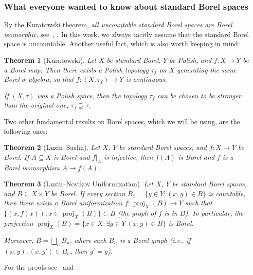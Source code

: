 \documentclass[11pt]{paper}
\newtheorem*{theorem*}{Theorem}
\begin{document}
\subsubsection*{What everyone wanted to know about standard Borel spaces}
By the Kuratowski theorem, {\em all uncountable standard Borel spaces are Borel isomorphic},
see~\cite[Section~3.3]{Srivastava}, \cite[Section~15B]{Kechris}.
In this work, we always tacitly assume that the standard Borel space is uncountable.
Another useful fact, which is also worth keeping in mind:
\begin{theorem*}[Kuratowski]
Let $X$ be standard Borel,  $Y$ be Polish, and $f\colon X\to Y$ be a Borel map.
Then there exists a Polish topology $\tau_f$ on $X$ generating the same Borel $\sigma$-algebra,
so that $f\colon (X, \tau_f) \to Y$ is continuous.

If $(X, \tau)$ was a Polish space, then the topology $\tau_f$ can be chosen to be stronger
than the original one, $\tau_f \supseteq \tau$.
\end{theorem*}
Two other fundamental results on Borel spaces, which we will be using, are the following ones:
\begin{theorem*}[Luzin--Suslin]
Let $X$, $Y$ be standard Borel spaces, and $f\colon X\to Y$ be Borel. If $A\subseteq X$ is Borel
and $f|_A$ is injective, then $f(A)$ is Borel and $f$ is a Borel isomorphism $A\to f(A)$.
\end{theorem*}
\begin{theorem*}[Luzin--Novikov Uniformization]
Let $X$, $Y$ be standard Borel spaces, and $B\subseteq X \times Y$ be Borel. If every section
$B_x = \{y\in Y\colon (x, y)\in B\}$ is countable, then there exists a Borel
uniformization $f\colon \operatorname{proj}_X(B)\to Y$
such that $\{(x, f(x))\colon x\in \operatorname{proj}_X(B)\}\subset B$ {\rm (}the graph of $f$ is in $B${\rm )}.
In particular, the projection $\operatorname{proj}_X(B) =\{x\in X\colon \exists y\in Y\ (x, y)\in B\}$
is Borel.

Moreover, $B=\bigsqcup_n B_n$, where each $B_n$ is a Borel graph
{\rm (}i.e., if $(x, y), (x, y')\in B_n$, then $y'=y${\rm )}.
\end{theorem*}
\noindent For the proofs see~\cite[Proposition~4.5.1 and Theorem~5.7.2]{Srivastava}
and~\cite[Theorems~15.1 and 18.10]{Kechris}.
\end{document}
